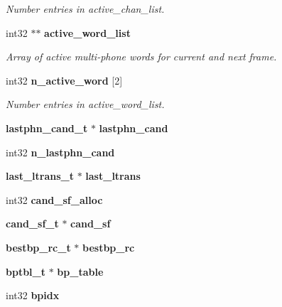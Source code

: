 \begin{DoxyCompactItemize}
\begin{DoxyCompactList}\small\item\em Number entries in active\-\_\-chan\-\_\-list. \end{DoxyCompactList}\item 
int32 $\ast$$\ast$ {\bf active\-\_\-word\-\_\-list}
\begin{DoxyCompactList}\small\item\em Array of active multi-\/phone words for current and next frame. \end{DoxyCompactList}\item 
int32 {\bf n\-\_\-active\-\_\-word} [2]\label{structngram__search__s_a5c864f1fe331fc95c04e0d87a5bdf9ee}

\begin{DoxyCompactList}\small\item\em Number entries in active\-\_\-word\-\_\-list. \end{DoxyCompactList}\item 
{\bf lastphn\-\_\-cand\-\_\-t} $\ast$ {\bfseries lastphn\-\_\-cand}\label{structngram__search__s_a82d9662cfa82599617176eb5c4e5f15f}

\item 
int32 {\bfseries n\-\_\-lastphn\-\_\-cand}\label{structngram__search__s_ad8b16d4873706ca29a6e22e2143ae896}

\item 
{\bf last\-\_\-ltrans\-\_\-t} $\ast$ {\bfseries last\-\_\-ltrans}\label{structngram__search__s_a3f1429a7dd697c6537c353f172fea97f}

\item 
int32 {\bfseries cand\-\_\-sf\-\_\-alloc}\label{structngram__search__s_ae17322f484615fa7ecb2c40ebeceecd9}

\item 
{\bf cand\-\_\-sf\-\_\-t} $\ast$ {\bfseries cand\-\_\-sf}\label{structngram__search__s_a3304d30024b83107ed8e5e2dd770334b}

\item 
{\bf bestbp\-\_\-rc\-\_\-t} $\ast$ {\bfseries bestbp\-\_\-rc}\label{structngram__search__s_a8ab80281d54e9fa14a3631cb5b5e97a7}

\item 
{\bf bptbl\-\_\-t} $\ast$ {\bfseries bp\-\_\-table}\label{structngram__search__s_a44b5476f901d827d5e6a23a5aa11eb43}

\item 
int32 {\bfseries bpidx}\label{structngram__search__s_ad72007665bf21bb12261eb63c996a987}


\end{DoxyCompactItemize}
